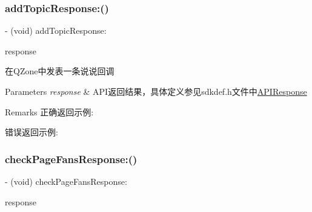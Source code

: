 \subsubsection{\texorpdfstring{add\+Topic\+Response\+:()}{addTopicResponse:()}\hspace{0.1cm}{\footnotesize\ttfamily [2/2]}}
{\footnotesize\ttfamily -\/ (void) add\+Topic\+Response\+: \begin{DoxyParamCaption}\item[{(\mbox{\hyperlink{interface_a_p_i_response}{A\+P\+I\+Response}} $\ast$)}]{response }\end{DoxyParamCaption}\hspace{0.3cm}{\ttfamily [optional]}}

在\+Q\+Zone中发表一条说说回调 
\begin{DoxyParams}{Parameters}
{\em response} & A\+P\+I返回结果，具体定义参见sdkdef.\+h文件中\mbox{\hyperlink{interface_a_p_i_response}{A\+P\+I\+Response}} \\
\hline
\end{DoxyParams}
\begin{DoxyRemark}{Remarks}
正确返回示例\+: 
\begin{DoxyCodeInclude}
\end{DoxyCodeInclude}
 错误返回示例\+: 
\begin{DoxyCodeInclude}
\end{DoxyCodeInclude}

\end{DoxyRemark}
\mbox{\label{protocol_tencent_session_delegate-p_a3180b739637e48ae4c986eb98caa3307}} 
\subsubsection{\texorpdfstring{check\+Page\+Fans\+Response\+:()}{checkPageFansResponse:()}\hspace{0.1cm}{\footnotesize\ttfamily [1/2]}}
{\footnotesize\ttfamily -\/ (void) check\+Page\+Fans\+Response\+: \begin{DoxyParamCaption}\item[{(\mbox{\hyperlink{interface_a_p_i_response}{A\+P\+I\+Response}} $\ast$)}]{response }\end{DoxyParamCaption}\hspace{0.3cm}{\ttfamily [optional]}}

